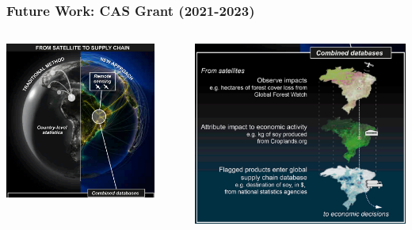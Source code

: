 \documentclass[aspectratio=169]{beamer}
\begin{document}
\begin{frame}
  \frametitle{Future Work: CAS Grant (2021-2023)}
\begin{columns}
\begin{column}{0.5\textwidth}
    \begin{center}
     \includegraphics[width=0.86\textwidth]{images/moran_2020_1.png}
     \end{center}
\end{column}
\begin{column}{0.5\textwidth}  %
    \begin{center}
     \includegraphics[width=1.0\textwidth]{images/moran_2020_2.png}
     \end{center}
\end{column}
\end{columns}
\end{frame}
\end{document}
